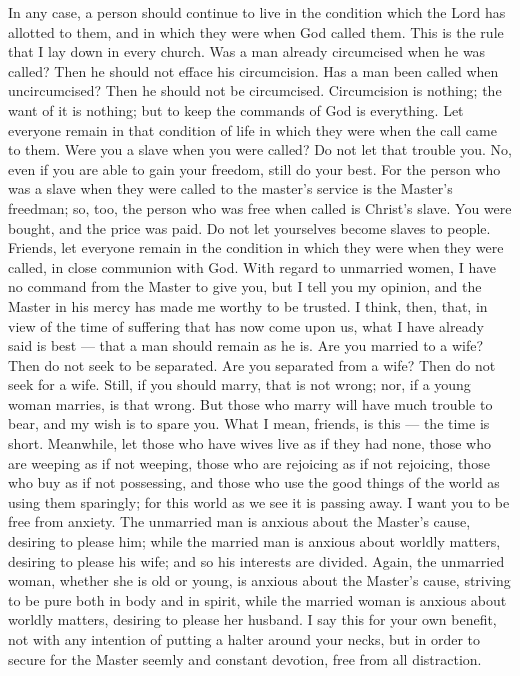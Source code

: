 In any case, a person should continue to live in the
condition which the Lord has allotted to them, and in which they were
when God called them. This is the rule that I lay down in every church.
 Was a man already circumcised when he was called? Then he
should not efface his circumcision. Has a man been called when
uncircumcised? Then he should not be circumcised. 
Circumcision is nothing; the want of it is nothing; but to keep the
commands of God is everything.  Let everyone remain in that
condition of life in which they were when the call came to them.
 Were you a slave when you were called? Do not let that
trouble you. No, even if you are able to gain your freedom, still do
your best.  For the person who was a slave when they were
called to the master's service is the Master's freedman; so, too, the
person who was free when called is Christ's slave.  You
were bought, and the price was paid. Do not let yourselves become slaves
to people.  Friends, let everyone remain in the condition
in which they were when they were called, in close communion with God.
 With regard to unmarried women, I have no command from the
Master to give you, but I tell you my opinion, and the Master in his
mercy has made me worthy to be trusted.  I think, then,
that, in view of the time of suffering that has now come upon us, what I
have already said is best --- that a man should remain as he is.
 Are you married to a wife? Then do not seek to be
separated. Are you separated from a wife? Then do not seek for a wife.
 Still, if you should marry, that is not wrong; nor, if a
young woman marries, is that wrong. But those who marry will have much
trouble to bear, and my wish is to spare you.  What I mean,
friends, is this --- the time is short. Meanwhile, let those who have
wives live as if they had none,  those who are weeping as
if not weeping, those who are rejoicing as if not rejoicing, those who
buy as if not possessing,  and those who use the good
things of the world as using them sparingly; for this world as we see it
is passing away.  I want you to be free from anxiety. The
unmarried man is anxious about the Master's cause, desiring to please
him;  while the married man is anxious about worldly
matters, desiring to please his wife;  and so his interests
are divided. Again, the unmarried woman, whether she is old or young, is
anxious about the Master's cause, striving to be pure both in body and
in spirit, while the married woman is anxious about worldly matters,
desiring to please her husband.  I say this for your own
benefit, not with any intention of putting a halter around your necks,
but in order to secure for the Master seemly and constant devotion, free
from all distraction.

